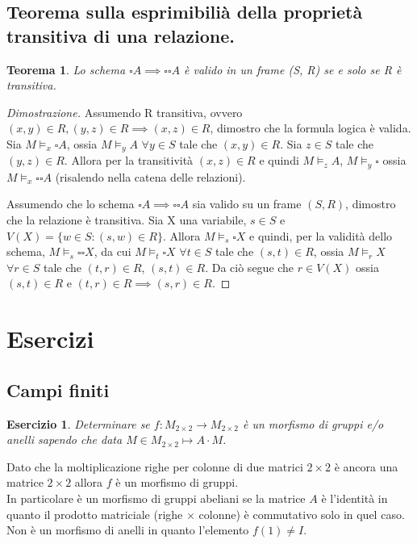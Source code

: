 \documentclass{article}
\theoremstyle{definition}
\theoremstyle{plain}
\theoremstyle{plain}
\theoremstyle{plain}
\newtheorem{teorema}{Teorema}
\theoremstyle{plain}
\newtheorem{esercizio}{Esercizio}
\begin{document}
\subsection{Teorema sulla esprimibilià della proprietà transitiva di una relazione.}
\begin{teorema}
    Lo schema $\square A \implies \square \square A$ è valido in un frame (S, R) se e solo se R è transitiva.
\end{teorema} 
\begin{proof}[Dimostrazione]
    Assumendo R transitiva, ovvero $(x, y) \in R, (y, z) \in R \implies (x, z) \in R$, dimostro che la formula logica è valida. \newline 
    Sia $M \models_x \square A$, ossia $M \models_y A$ $\forall y \in S$ tale che $(x, y) \in R$.
    Sia $z \in S$ tale che $(y, z) \in R$. Allora per la transitività $(x, z) \in R$ e quindi $M \models_z A$, $M \models_y \square$  ossia $M \models_x \square \square A$ (risalendo nella catena delle relazioni). \newline

    Assumendo che lo schema $\square A \implies \square \square A$ sia valido su un frame $(S, R)$, dimostro che la relazione è transitiva. \newline
    Sia X una variabile, $s \in S$ e $V(X) = \{w \in S : (s, w) \in R\}$. Allora $M \models_s \square X$ e quindi, per la validità dello schema, $M \models_s \square \square X$, da cui $M \models_t \square X$ $\forall t \in S$ tale che $(s, t) \in R$, ossia $M \models_r X$ $\forall r \in S$ tale che $(t, r) \in R$, $(s, t) \in R$. \newline
    Da ciò segue che $r \in V(X)$ ossia $(s, t) \in R$ e $(t, r) \in R \implies (s, r) \in R$.
\end{proof}
\newpage

\section{Esercizi}
\subsection*{Campi finiti}
\begin{esercizio}
    Determinare se $f : M_{2\times 2} \rightarrow M_{2\times 2}$ è un morfismo di gruppi e/o anelli sapendo che data $M \in M_{2\times 2} \mapsto A \cdot M$.
\end{esercizio}
Dato che la moltiplicazione righe per colonne di due matrici $2 \times 2$ è ancora una matrice $2 \times 2$ allora $f$ è un morfismo di gruppi. \\
In particolare è un morfismo di gruppi abeliani se la matrice $A$ è l'identità in quanto il prodotto matriciale (righe $\times$ colonne) è commutativo solo in quel caso. \\
Non è un morfismo di anelli in quanto l'elemento $f(1) \neq I$.
\end{document}
